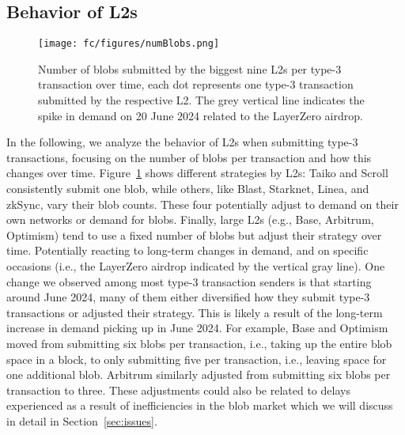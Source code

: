 \subsection{Behavior of L2s}
\begin{figure}[t]\vspace{-6pt}
    \centering
    \texttt{[image: fc/figures/numBlobs.png]}\vspace{-6pt}
    \caption{Number of blobs submitted by the biggest nine L2s per type-3 transaction over time, each dot represents one type-3 transaction submitted by the respective L2. The grey vertical line indicates the spike in demand on 20 June 2024 related to the LayerZero airdrop. }
    \label{fig:numBlobs}
\end{figure}

In the following, we analyze the behavior of L2s when submitting type-3 transactions, focusing on the number of blobs per transaction and how this changes over time. Figure~\ref{fig:numBlobs} shows different strategies by L2s: Taiko and Scroll consistently submit one blob, while others, like Blast, Starknet, Linea, and zkSync, vary their blob counts. These four potentially adjust to demand on their own networks or demand for blobs. Finally, large L2s (e.g., Base, Arbitrum, Optimism) tend to use a fixed number of blobs but adjust their strategy over time. Potentially reacting to long-term changes in demand, and on specific occasions (i.e., the LayerZero airdrop indicated by the vertical gray line). One change we observed among most type-3 transaction senders is that starting around June 2024, many of them either diversified how they submit type-3 transactions or adjusted their strategy. This is likely a result of the long-term increase in demand picking up in June 2024. For example, Base and Optimism moved from submitting six blobs per transaction, i.e., taking up the entire blob space in a block, to only submitting five per transaction, i.e., leaving space for one additional blob. Arbitrum similarly adjusted from submitting six blobs per transaction to three. These adjustments could also be related to delays experienced as a result of inefficiencies in the blob market which we will discuss in detail in Section~\ref{sec:issues}.




